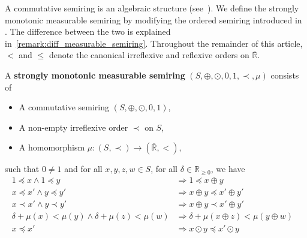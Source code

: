 A commutative semiring is an algebraic structure (see~\cite[Definition 4]{bruggink2015proving}\cite[Definition 2.5]{endrullis2024generalized}). 
We define the strongly monotonic measurable semiring by modifying the ordered semiring introduced in \cite[Definition 2.6]{endrullis2024generalized}. The difference between the two is explained in~\autoref{remark:diff_measurable_semiring}.
Throughout the remainder of this article, $<$ and $\leq$ denote the canonical irreflexive and reflexive orders on $\overline{\mathbb{R}}$.
\begin{definition}
    \label{def:real_strongly_monotonic_semiring}
    A \textbf{strongly monotonic measurable semiring} $(S, \oplus, \odot, 0, 1, \prec, \mu)$ consists of
    \begin{itemize}
        \item A commutative semiring $(S, \oplus, \odot, 0, 1)$,
        \item A non-empty irreflexive order $\prec$ on $S$,
        \item A homomorphism $\mu : (S, \prec) \to ( \overline{\mathbb{R}}, < )$,
    \end{itemize}
    such that $0 \neq 1$ and for all $x,y,z,w \in S$, for all $\delta \in \mathbb{R}_{\geq 0}$, we have
        \begin{align*}
            1 \preceq x \land 1 \preceq y 
            &\Rightarrow
            1 \preceq x \oplus y
            &\tag{S0} \label{ax:s0} 
            \\ 
            x \preceq x' \land y \preceq y' 
            &\Rightarrow
            x \oplus y \preceq x' \oplus y'
            &\tag{S1} \label{ax:s1} 
            \\   
            x \prec x' \land y \prec y'  
            &\Rightarrow
            x \oplus y \prec x' \oplus y'
            &\tag{S2} \label{ax:s2} 
            \\
            \delta + \mu(x) < \mu(y) \land \delta + \mu(z) < \mu(w)
            &\Rightarrow
            \delta + \mu(x \oplus z) < \mu(y \oplus w)
            &\tag{S3} \label{ax:s2'}
            \\
            x \preceq x'
            &\Rightarrow 
            x \odot y \preceq x' \odot y 
            &\tag{S4} \label{ax:s3} 
            \\

\end{align*}
\end{definition}
